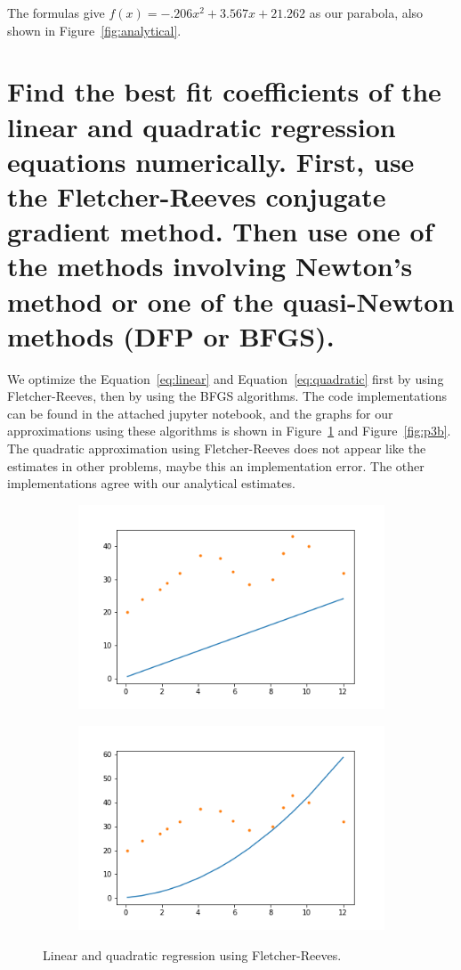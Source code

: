 \documentclass[11pt,margin=1in]{scrartcl}
\begin{document}
The formulas give $f(x) = -.206x^2 + 3.567x + 21.262$ as our parabola, also shown in Figure~\ref{fig:analytical}.
\section{Find the best fit coefficients of the linear and quadratic 
regression equations numerically. First, use the Fletcher-Reeves 
conjugate gradient method. Then use one of the methods involving Newton's method or one of the 
quasi-Newton methods (DFP or BFGS).}

We optimize the Equation~\ref{eq:linear} and Equation~\ref{eq:quadratic} first by using Fletcher-Reeves, then by 
using the BFGS algorithms.
The code implementations can be found in the attached jupyter notebook, and the graphs for our approximations using
these algorithms is shown in Figure~\ref{fig:p3a} and Figure~\ref{fig:p3b}.
The quadratic approximation using Fletcher-Reeves does not appear like the estimates in other problems, maybe this 
an implementation error. 
The other implementations agree with our analytical estimates.

\begin{figure}
	\centering
	\begin{subfigure}{0.4\textwidth}
			\includegraphics[scale=0.5]{FRLinear}
	\end{subfigure}
	\begin{subfigure}{0.4\textwidth}
			\includegraphics[scale=0.5]{FRQuad}
	\end{subfigure}
	\caption{Linear and quadratic regression using Fletcher-Reeves.}
	\label{fig:p3a}
\end{figure}
\end{document}
